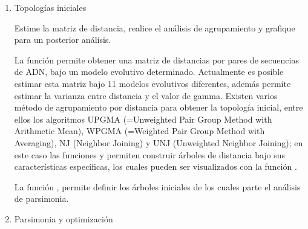 \begin{itemize}
\begin{enumerate}
\item{Topolog\'ias iniciales}

Estime la matriz de distancia,  realice el an\'alisis de agrupamiento y grafique para un posterior an\'alisis.



La funci\'on  permite obtener una matriz de distancias por pares de secuencias de ADN,  bajo un modelo evolutivo determinado. 
Actualmente es posible estimar esta matriz bajo 11 modelos evolutivos diferentes,  adem\'as permite estimar la varianza entre distancia y el valor de gamma. Existen varios m\'etodo de agrupamiento por distancia para obtener la topolog\'ia inicial,  entre ellos los algoritmos UPGMA (=Unweighted Pair Group Method with Arithmetic Mean),  WPGMA (=Weighted Pair Group Method with Averaging),  NJ (Neighbor Joining) y UNJ (Unweighted Neighbor Joining); en este caso las funciones  y  permiten construir \'arboles de distancia bajo sus caracter\'isticas espec\'ificas,  los cuales pueden ser visualizados con la funci\'on .



La funci\'on  , permite definir los \'arboles iniciales de los cuales parte el an\'alisis de parsimonia.




{}



\item{Parsimonia y optimizaci\'on}
 

\end{enumerate}
\end{itemize}

